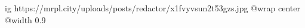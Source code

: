  
 
 
 
 

\ifcmt
  ig https://mrpl.city/uploads/posts/redactor/x1fvyvsun2t53gzs.jpg
  @wrap center
  @width 0.9
\fi
